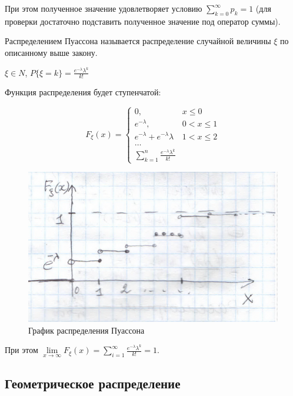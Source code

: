 При этом полученное значение удовлетворяет условию $\sum\limits_{k = 0}^\infty p_k = 1$ (для проверки достаточно
подставить полученное значение под оператор суммы).

Распределением Пуассона называется распределение
случайной величины $\xi$ по описанному выше закону.

$\displaystyle \xi \in N$, $P\{\xi = k\} = \frac{e^{-\lambda} \lambda^k}{k!}$

Функция распределения будет ступенчатой:

\begin{equation*} \displaystyle
    F_\xi(x) = 
    \begin{cases}
        0, & x \leq 0 \\
        e^{-\lambda}, & 0 < x \leq 1 \\
        e^{-\lambda} + e^{-\lambda} \lambda & 1 < x \leq 2 \\
        \dots \\
        \sum\limits_{k = 1}^n \frac{e^{-\lambda} \lambda^k}{k!}
    \end{cases}
\end{equation*}

\begin{figure}[H]
    \centering
    \includegraphics[scale=0.5]{images/puasgraph.png}
    \caption{График распределения Пуассона}
\end{figure}

При этом $\lim\limits_{x \rightarrow \infty} F_\xi(x) = \sum\limits_{i = 1}^\infty \frac{e^{-\lambda} \lambda^k}{k!} = 1$.

\subsection{Геометрическое распределение}

